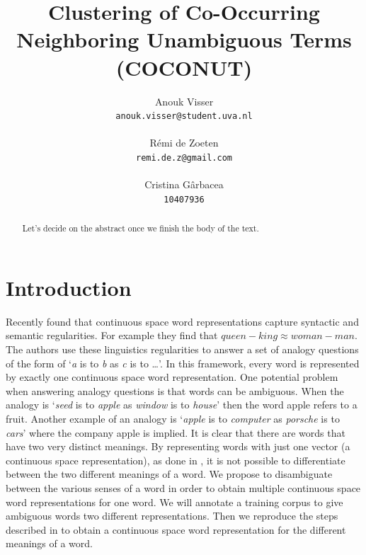 \documentclass[11pt]{article}
\title{Clustering of Co-Occurring Neighboring Unambiguous Terms (COCONUT)}
\author{
Anouk Visser \\
{\tt anouk.visser@student.uva.nl}\\
  \\\And
  R\'emi de Zoeten \\
  {\tt remi.de.z@gmail.com}\\
   \\\And
  Cristina G\^arbacea \\
  {\tt 10407936}
  \\}
\date{}
\begin{document}
\maketitle
\begin{abstract}
Let's decide on the abstract once we finish the body of the text.
\end{abstract}

\section{Introduction}
Recently \cite{Mikolov:13} found that continuous space word representations capture syntactic and semantic regularities. For example they find that $\textit{queen} - \textit{king} \approx \textit{woman}  -\textit{man}$. The authors use these linguistics regularities to answer a set of analogy questions of the form of `\textit{a} is to \textit{b} as \textit{c} is to \dots'. In this framework, every word is represented by exactly one continuous space word representation. One potential problem when answering analogy questions is that words can be ambiguous. When the analogy is `\textit{seed} is to \textit{apple} as \textit{window} is to \textit{house}' then the word apple refers to a fruit. Another example of an analogy is `\textit{apple} is to \textit{computer} as \textit{porsche} is to \textit{cars}' where the company apple is implied. It is clear that there are words that have two very distinct meanings. By representing words with just one vector (a continuous space representation), as done in \cite{Mikolov:13}, it is not possible to differentiate between the two different meanings of a word. We propose to disambiguate between the various senses of a word in order to obtain multiple continuous space word representations for one word. We will annotate a training corpus to give ambiguous words two different representations. Then we reproduce the steps described in \cite{Mikolov:13} to obtain a continuous space word representation for the different meanings of a word.
\end{document}
